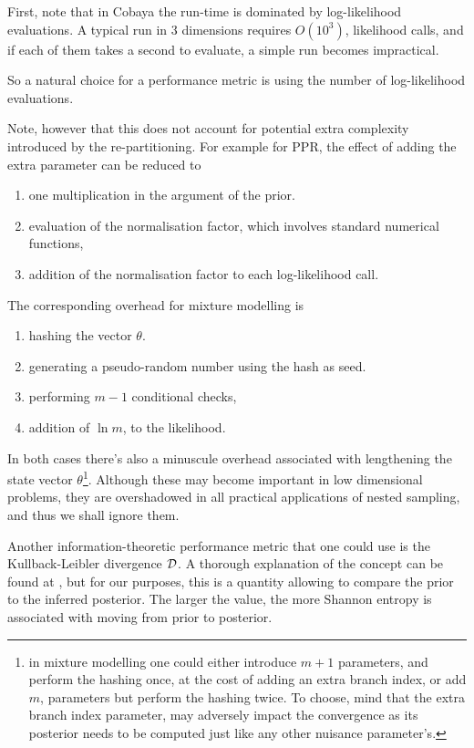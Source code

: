 \documentclass[usenatbib]{mnras}
\begin{document}
First, note that in Cobaya  the run-time is dominated
by log-likelihood evaluations. A typical run in 3 dimensions
requires \(O(10^{3})\), likelihood calls, and if each of them takes a
second to evaluate, a simple run becomes impractical. 

So a natural choice for a performance metric is using the number of
log-likelihood evaluations. 

Note, however that this does not account for potential extra
complexity introduced by the re-partitioning. For example for PPR,
the effect of adding the extra parameter can be reduced to
\begin{enumerate}
\item one multiplication in the argument of the prior.
\item evaluation of the normalisation factor, which involves standard
numerical functions,
\item addition of the normalisation factor to each log-likelihood call.
\end{enumerate}

The corresponding overhead for mixture modelling is
\begin{enumerate}
\item hashing the vector \(\theta\).
\item generating a pseudo-random number using the hash as seed.
\item performing \(m-1\) conditional checks,
\item addition of \(\ln m\), to the likelihood.
\end{enumerate}

In both cases there's also a minuscule overhead associated with
lengthening the state vector \(\theta\)\footnote{in mixture modelling one could either introduce \(m+1\)
parameters, and perform the hashing once, at the cost of adding an
extra branch index, or add \(m\), parameters but perform the hashing
twice. To choose, mind that the extra branch index parameter, may
adversely impact the convergence as its posterior needs to be computed
just like any other nuisance parameter's.}.  Although these may
become important in low dimensional problems, they are overshadowed
in all practical applications of nested sampling, and thus we shall
ignore them.

Another information-theoretic performance metric that one could use
is the Kullback-Leibler divergence \({\cal D}\). A thorough
explanation of the concept can be found at \cite{Kullback_1951}, but
for our purposes, this is a quantity allowing to compare the prior
to the inferred posterior. The larger the value, the more Shannon
entropy is associated with moving from prior to posterior. 
\end{document}
